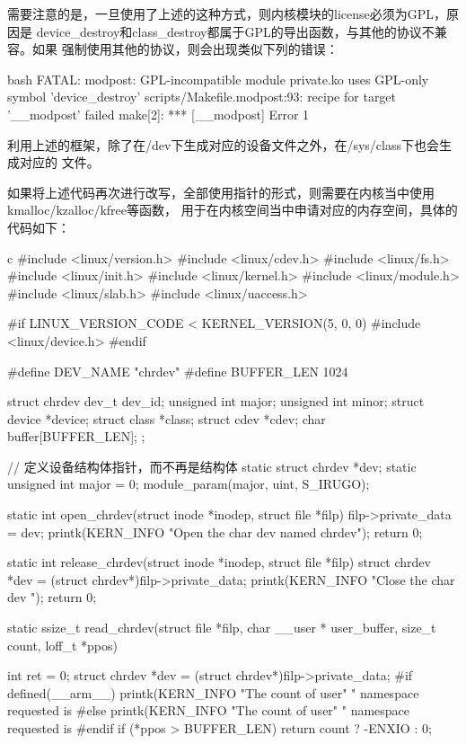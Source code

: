 需要注意的是，一旦使用了上述的这种方式，则内核模块的license必须为GPL，原因是
device\_destroy和class\_destroy都属于GPL的导出函数，与其他的协议不兼容。如果
强制使用其他的协议，则会出现类似下列的错误：
\begin{code-block}{bash}
FATAL: modpost: GPL-incompatible module private.ko uses GPL-only symbol 'device_destroy'
scripts/Makefile.modpost:93: recipe for target '__modpost' failed
make[2]: *** [__modpost] Error 1
\end{code-block}
利用上述的框架，除了在/dev下生成对应的设备文件之外，在/sys/class下也会生成对应的
文件。

如果将上述代码再次进行改写，全部使用指针的形式，则需要在内核当中使用kmalloc/kzalloc/kfree等函数，
用于在内核空间当中申请对应的内存空间，具体的代码如下：
\begin{code-block}{c}
#include <linux/version.h>
#include <linux/cdev.h>
#include <linux/fs.h>
#include <linux/init.h>
#include <linux/kernel.h>
#include <linux/module.h>
#include <linux/slab.h>
#include <linux/uaccess.h>

#if LINUX_VERSION_CODE < KERNEL_VERSION(5, 0, 0)
#include <linux/device.h>
#endif

#define DEV_NAME "chrdev"
#define BUFFER_LEN 1024

struct chrdev {
        dev_t         dev_id;
        unsigned int  major;
        unsigned int  minor;
        struct device *device;
        struct class  *class;
        struct cdev   *cdev;
        char          buffer[BUFFER_LEN];
};

// 定义设备结构体指针，而不再是结构体
static struct chrdev *dev;
static unsigned int major = 0;
module_param(major, uint, S_IRUGO);

static int open_chrdev(struct inode *inodep, struct file *filp)
{
        filp->private_data = dev;
        printk(KERN_INFO "Open the char dev named chrdev\n");
        return 0;
}

static int release_chrdev(struct inode *inodep, struct file *filp)
{
        struct chrdev *dev = (struct chrdev*)filp->private_data;
        printk(KERN_INFO "Close the char dev \n");
        return 0;
}

static ssize_t read_chrdev(struct file *filp,
        char __user * user_buffer, size_t count, loff_t *ppos)
{
        int ret = 0;
        struct chrdev *dev = (struct chrdev*)filp->private_data;
#if defined(__arm__)
        printk(KERN_INFO "The count of user"
                " namespace requested is %
#else
        printk(KERN_INFO "The count of user"
                " namespace requested is %
#endif
        if (*ppos > BUFFER_LEN) {
                return count ? -ENXIO : 0;
        }

}
\end{code-block}
